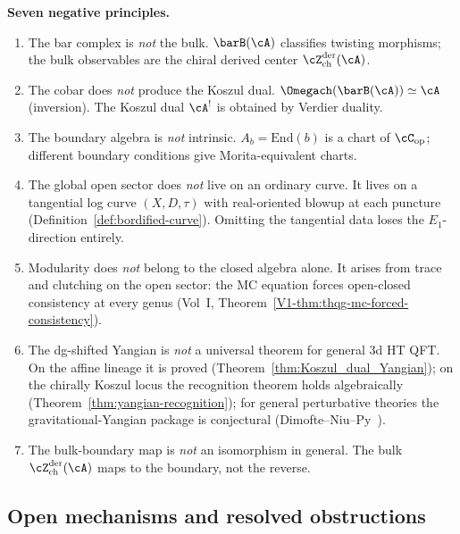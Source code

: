 \medskip
\noindent\textbf{Seven negative principles.}
\begin{enumerate}[label=\textup{(N\arabic*)}]
\item The bar complex is \emph{not} the bulk.
 $\barB(\cA)$ classifies twisting morphisms; the bulk observables
 are the chiral derived center $\cZ^{\mathrm{der}}_{\mathrm{ch}}(\cA)$.
\item The cobar does \emph{not} produce the Koszul dual.
 $\Omegach(\barB(\cA)) \simeq \cA$ (inversion).
 The Koszul dual $\cA^!$ is obtained by Verdier duality.
\item The boundary algebra is \emph{not} intrinsic.
 $A_b = \mathrm{End}(b)$ is a chart of
 $\cC_{\mathrm{op}}$; different boundary conditions give
 Morita-equivalent charts.
\item The global open sector does \emph{not} live on an ordinary
 curve. It lives on a tangential log curve $(X,D,\tau)$ with
 real-oriented blowup at each puncture
 (Definition~\ref{def:bordified-curve}). Omitting the tangential
 data loses the $E_1$-direction entirely.
\item Modularity does \emph{not} belong to the closed algebra alone.
 It arises from trace and clutching on the open sector:
 the MC equation forces open-closed consistency at every genus
 (Vol~I, Theorem~\ref*{V1-thm:thqg-mc-forced-consistency}).
\item The dg-shifted Yangian is \emph{not} a universal theorem for
 general 3d HT QFT. On the affine lineage it is proved
 (Theorem~\ref{thm:Koszul_dual_Yangian}); on the chirally Koszul
 locus the recognition theorem holds algebraically
 (Theorem~\ref{thm:yangian-recognition}); for general perturbative
 theories the gravitational-Yangian package is conjectural
 (Dimofte--Niu--Py~\cite{DNP25}).
\item The bulk-boundary map is \emph{not} an isomorphism in general.
 The bulk $\cZ^{\mathrm{der}}_{\mathrm{ch}}(\cA)$ maps to the
 boundary, not the reverse.
\end{enumerate}

\subsection{Open mechanisms and resolved obstructions}
\label{sec:research-signals}

